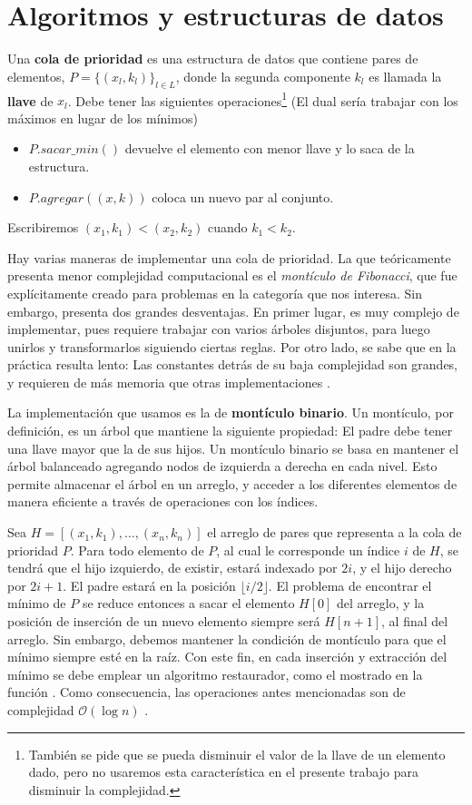 \documentclass[journal]{IEEEtran}
\begin{document}
\section{Algoritmos y estructuras de datos}

Una \textbf{cola de prioridad} es una estructura de datos que contiene pares de elementos, \(P = \{(x_l, k_l)\}_{l \in L}\), donde la segunda componente \(k_l\) es llamada la \textbf{llave} de \(x_l\). Debe tener las siguientes operaciones\footnote{También se pide que se pueda disminuir el valor de la llave de un elemento dado, pero no usaremos esta característica en el presente trabajo para disminuir la complejidad.} (El dual sería trabajar con los máximos en lugar de los mínimos) \cite{clrs}

\begin{itemize}
	\item \(P.sacar\_min()\) devuelve el elemento con menor llave y lo saca de la estructura.
	\item \(P.agregar((x, k))\) coloca un nuevo par al conjunto.
\end{itemize}

Escribiremos \((x_1, k_1) < (x_2, k_2)\) cuando \(k_1 < k_2\).

Hay varias maneras de implementar una cola de prioridad. La que teóricamente presenta menor complejidad computacional es el \textit{montículo de Fibonacci}, que fue explícitamente creado para problemas en la categoría que nos interesa. Sin embargo, presenta dos grandes desventajas. En primer lugar, es muy complejo de implementar, pues requiere trabajar con varios árboles disjuntos, para luego unirlos y transformarlos siguiendo ciertas reglas. Por otro lado, se sabe que en la práctica resulta lento: Las constantes detrás de su baja complejidad son grandes, y requieren de más memoria que otras implementaciones \cite{heap}.

La implementación que usamos es la de \textbf{montículo binario}. Un montículo, por definición, es un árbol que mantiene la siguiente propiedad: El padre debe tener una llave mayor que la de sus hijos. Un montículo binario se basa en mantener el árbol balanceado agregando nodos de izquierda a derecha en cada nivel. Esto permite almacenar el árbol en un arreglo, y acceder a los diferentes elementos de manera eficiente a través de operaciones con los índices.

Sea \(H = [(x_1, k_1),\ldots,(x_n, k_n)]\) el arreglo de pares que representa a la cola de prioridad \(P\). Para todo elemento de \(P\), al cual le corresponde un índice \(i\) de \(H\), se tendrá que el hijo izquierdo, de existir, estará indexado por \(2i\), y el hijo derecho por \(2i + 1\). El padre estará en la posición \( \lfloor i/2 \rfloor \). El problema de encontrar el mínimo de \(P\) se reduce entonces a sacar el elemento \(H[0]\) del arreglo, y la posición de inserción de un nuevo elemento siempre será \(H[n+1]\), al final del arreglo. Sin embargo, debemos mantener la condición de montículo para que el mínimo siempre esté en la raíz. Con este fin, en cada inserción y extracción del mínimo se debe emplear un algoritmo restaurador, como el mostrado en la función . Como consecuencia, las operaciones antes mencionadas son de complejidad \( \mathcal{O}(\log n) \) \cite{clrs}.
\end{document}
